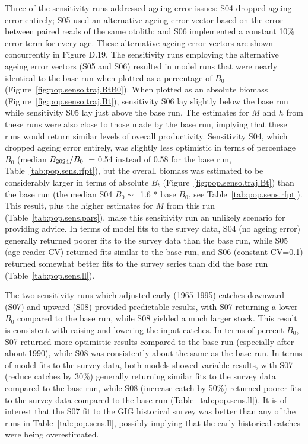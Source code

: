 \documentclass[11pt]{book}
\newcommand{\pc}{\%}
\begin{document}
Three of the sensitivity runs addressed ageing error issues: S04 dropped ageing error entirely; S05 used an alternative ageing error vector based on the error between paired reads of the same otolith; and S06 implemented a constant 10\pc{} error term for every age. 
These alternative ageing error vectors are shown concurrently in Figure D.19. 
The sensitivity runs employing the alternative ageing error vectors (S05 and S06) resulted in model runs that were nearly identical to the base run when plotted as a percentage of $B_0$ (Figure~\ref{fig:pop.senso.traj.BtB0}). 
When plotted as an absolute biomass (Figure~\ref{fig:pop.senso.traj.Bt}), sensitivity S06 lay slightly below the base run while sensitivity S05 lay just above the base run.
The estimates for $M$ and $h$ from these runs were also close to those made by the base run, implying that these runs would return similar levels of overall productivity.
Sensitivity S04, which dropped ageing error entirely, was slightly less optimistic in terms of percentage $B_0$ (median $B_{2024}/B_0$~= 0.54 instead of 0.58 for the base run, Table~\ref{tab:pop.sens.rfpt}), but the overall biomass was estimated to be considerably larger in terms of absolute $B_t$ (Figure~\ref{fig:pop.senso.traj.Bt}) than the base run (the median S04 $B_0\sim$~1.6 * base $B_0$, see Table~\ref{tab:pop.sens.rfpt}). 
This result, plus the higher estimates for $M$ from this run (Table~\ref{tab:pop.sens.pars}), make this sensitivity run an unlikely scenario for providing advice.
In terms of model fits to the survey data, S04 (no ageing error) generally returned poorer fits to the survey data than the base run, while S05 (age reader CV) returned fits similar to the base run, and S06 (constant CV=0.1) returned somewhat better fits to the survey series than did the base run (Table~\ref{tab:pop.sens.ll}).

The two sensitivity runs which adjusted early (1965-1995) catches downward (S07) and upward (S08) provided predictable results, with S07 returning a lower $B_0$ compared to the base run, while S08 yielded a much larger stock.
This result is consistent with raising and lowering the input catches. 
In terms of percent $B_0$, S07 returned more optimistic results compared to the base run (especially after about 1990), while S08 was consistently about the same as the base run.
In terms of model fits to the survey data, both models showed variable results, with S07 (reduce catches by 30\pc) generally returning similar fits to the survey data compared to the base run, while S08 (increase catch by 50\pc) returned poorer fits to the survey data compared to the base run (Table~\ref{tab:pop.sens.ll}). 
It is of interest that the S07 fit to the GIG historical survey was better than any of the runs in Table~\ref{tab:pop.sens.ll}, possibly implying that the early historical catches were being overestimated.
\end{document}
